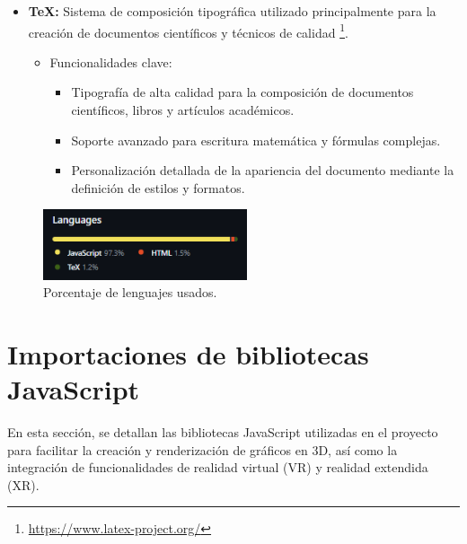 \documentclass[a4paper, 12pt]{book}
\begin{document}
\begin{itemize}
  \item \textbf{TeX:} Sistema de composición tipográfica utilizado principalmente para la creación de documentos científicos y técnicos de calidad
  \footnote{\url{https://www.latex-project.org/}}.
    \begin{itemize}
        \item Funcionalidades clave:
        \begin{itemize}
            \item Tipografía de alta calidad para la composición de documentos científicos, libros y artículos académicos.
            \item Soporte avanzado para escritura matemática y fórmulas complejas.
            \item Personalización detallada de la apariencia del documento mediante la definición de estilos y formatos.
        \end{itemize}
    \end{itemize}
\end{itemize}

\begin{figure}
  \centering
  \includegraphics[width=6cm, keepaspectratio]{img/lenguajes.png}
  \caption{Porcentaje de lenguajes usados.}
  \label{fig:lenguajes}
\end{figure}


\section{Importaciones de bibliotecas JavaScript} 
\label{sec:importaciones}

En esta sección, se detallan las bibliotecas JavaScript utilizadas en el proyecto para facilitar la creación y renderización de gráficos en 3D, 
así como la integración de funcionalidades de realidad virtual (VR) y realidad extendida (XR).
\end{document}

